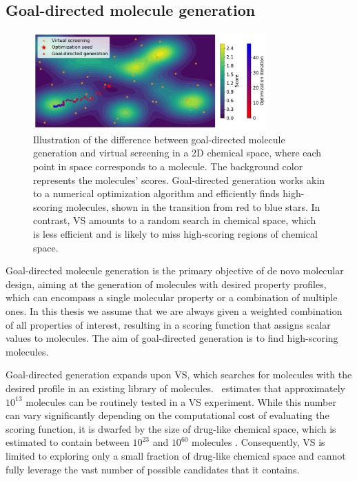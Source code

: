 \subsection{Goal-directed molecule generation}
\begin{figure}
	\centering
	\includegraphics[width=0.8\textwidth]{./figures/goal_directed_generation_vs.pdf}
	\caption{Illustration of the difference between goal-directed molecule generation and virtual
		screening in a 2D chemical space, where each point in space corresponds to a molecule. The
		background color represents the molecules' scores. Goal-directed generation works
		akin to a numerical optimization algorithm and efficiently finds high-scoring molecules,
		shown in the transition from red to blue stars. In contrast, VS amounts to a random search in chemical space, which is less efficient
		and is likely to miss high-scoring regions of chemical space. \label{fig:goal-directed-generation}}
\end{figure}

Goal-directed molecule generation is the primary objective of de novo molecular design, aiming at
the generation of molecules with desired property profiles, which can encompass a single molecular
property or a combination of multiple ones. In this thesis we assume that we are always given a
weighted combination of all properties of interest, resulting in a scoring function that assigns
scalar values to molecules. The aim of goal-directed generation is to find high-scoring molecules.

Goal-directed generation expands upon \ac{VS}, which searches for molecules with the desired profile
in an existing library of molecules.\ \citet{waltersVirtualChemicalLibraries2019} estimates that approximately
$10^{13}$ molecules can be routinely tested in a \ac{VS} experiment. While this number can vary
significantly depending on the computational cost of evaluating the scoring function, it is dwarfed
by the size of drug-like chemical space, which is estimated to contain between $10^{23}$ and
$10^{60}$ molecules \citep{waltersVirtualChemicalLibraries2019,polishchukEstimationSizeDruglike2013}.
Consequently, \ac{VS} is limited to exploring only a small fraction of drug-like chemical space and cannot
fully leverage the vast number of possible candidates that it contains.

